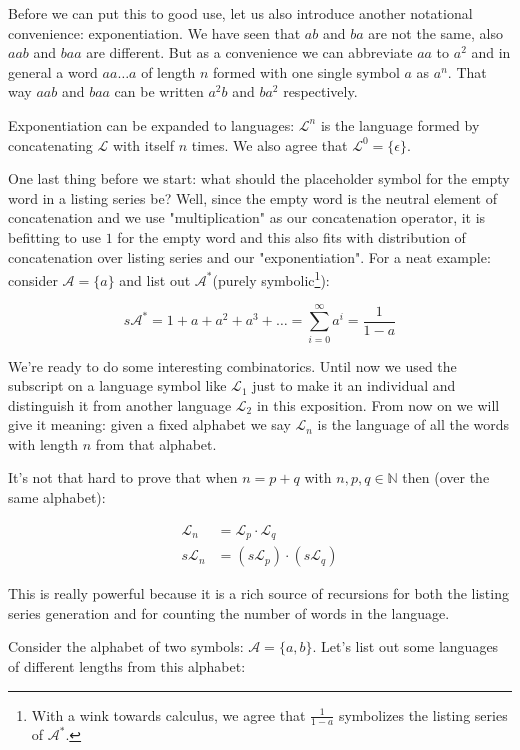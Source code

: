 Before we can put this to good use, let us also introduce another notational convenience: exponentiation. We have seen that $ab$ and $ba$ are not the same, also $aab$ and $baa$ are different. But as a convenience we can abbreviate $aa$ to $a^2$ and in general a word $aa\ldots a$ of length $n$ formed with one single symbol $a$ as $a^n$. That way $aab$ and $baa$ can be written $a^2b$ and $ba^2$ respectively.

Exponentiation can be expanded to languages: $\mathcal{L}^n$ is the language formed by concatenating $\mathcal{L}$ with itself $n$ times. We also agree that
$\mathcal{L}^0 = \{\epsilon\}$.
 
One last thing before we start: what should the placeholder symbol for the empty word in a listing series be? Well, since the empty word is the neutral element of concatenation and we use "multiplication" as our concatenation operator, it is befitting to use $1$ for the empty word and this also fits with distribution of concatenation over listing series and our "exponentiation". For a neat example: consider $\mathcal{A} = \{a\}$ and list out $\mathcal{A}^*$(purely symbolic\footnote{With a wink towards calculus, we agree that $\frac{1}{1 - a}$ symbolizes the listing series of $\mathcal{A}^*$.}):

$$
s \mathcal{A}^* = 1 + a + a^2 + a^3 + \ldots = \sum_{i = 0}^\infty a^i = \frac{1}{1 - a}
$$

We're ready to do some interesting combinatorics. Until now we used the subscript on a language symbol like $\mathcal{L}_1$ just to make it an individual and distinguish it from another language $\mathcal{L}_2$ in this exposition. From now on we will give it meaning: given a fixed alphabet we say $\mathcal{L}_n$ is the language of all the words with length $n$ from that alphabet.

It's not that hard to prove that when $n = p + q$ with $n, p, q \in \mathbb{N}$ then (over the same alphabet):

\begin{align*}
\mathcal{L}_n &=  \mathcal{L}_p \cdot \mathcal{L}_q \\
s \mathcal{L}_n &= (s \mathcal{L}_p) \cdot (s \mathcal{L}_q)
\end{align*}

This is really powerful because it is a rich source of recursions for both the listing series generation and for counting the number of words in the language.

Consider the alphabet of two symbols: $\mathcal{A} = \{a, b\}$. Let's list out some languages of different lengths from this alphabet:

